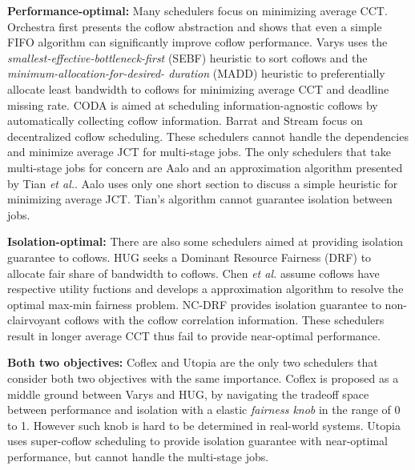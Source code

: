\documentclass[10pt, conference, letterpaper]{IEEEtran}
\begin{document}
\noindent\textbf{Performance-optimal:} Many schedulers focus on minimizing average CCT. Orchestra\cite{orchestra} first presents the coflow abstraction and shows that even a simple FIFO algorithm can significantly improve coflow performance. Varys\cite{varys} uses the \emph{smallest-effective-bottleneck-first} (SEBF) heuristic to sort coflows and the \emph{minimum-allocation-for-desired- duration} (MADD) heuristic to preferentially allocate least bandwidth to coflows for minimizing average CCT and deadline missing rate. CODA\cite{coda} is aimed at scheduling information-agnostic coflows by automatically collecting coflow information. Barrat\cite{barrat} and Stream\cite{stream} focus on decentralized coflow scheduling. These schedulers cannot handle the dependencies and minimize average JCT for multi-stage jobs. The only schedulers that take multi-stage jobs for concern are Aalo\cite{aalo} and an approximation algorithm presented by Tian \emph{et al.}\cite{bingchuan}. Aalo uses only one short section to discuss a simple heuristic for minimizing average JCT. Tian's algorithm cannot guarantee isolation between jobs.

\noindent\textbf{Isolation-optimal:} There are also some schedulers aimed at providing isolation guarantee to coflows. HUG\cite{HUG} seeks a Dominant Resource Fairness (DRF)\cite{DRF} to allocate fair share of bandwidth to coflows. Chen \emph{et al.}\cite{optimizing} assume coflows have respective utility fuctions and develops a approximation algorithm to resolve the optimal max-min fairness problem. NC-DRF\cite{fair} provides isolation guarantee to non-clairvoyant coflows with the coflow correlation information. These schedulers result in longer average CCT thus fail to provide near-optimal performance.

\noindent\textbf{Both two objectives:} Coflex\cite{coflex} and Utopia\cite{utopia} are the only two schedulers that consider both two objectives with the same importance. Coflex is proposed as a middle ground between Varys and HUG, by navigating the tradeoff space between performance and isolation with a elastic \emph{fairness knob} in the range of 0 to 1. However such knob is hard to be determined in real-world systems. Utopia uses super-coflow scheduling to provide isolation guarantee with near-optimal performance, but cannot handle the multi-stage jobs.
\end{document}
